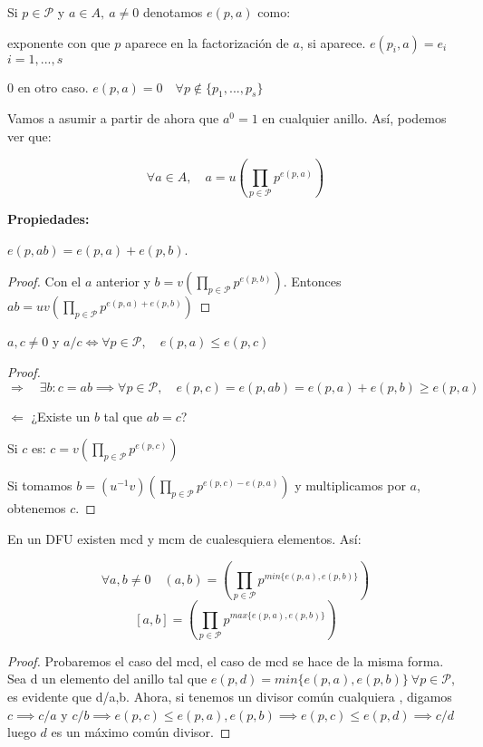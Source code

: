 \begin{ndef}[]
	Si $p\in \mathcal{P}$ y $a \in A,\ a \ne 0$ denotamos $e(p,a)$ como:
	\begin{nlist}
	\item exponente con que $p$ aparece en la factorización de $a$, si aparece. $e(p_i,a) = e_i$ \quad $i = 1,...,s$
	\item 0 en otro caso. $e(p,a) = 0 \quad \forall p \notin \{p_1,...,p_s\}$

\end{nlist}

	Vamos a asumir a partir de ahora que $a^0  = 1 $ en cualquier anillo. Así, podemos ver que:

	$$\forall a \in A, \quad a = u(\prod _{p \in \mathcal{P}}p^{e(p,a)})$$
\end{ndef}

\textbf{Propiedades:}
\begin{nlist}
	\item $e(p,ab) = e(p,a) + e(p,b)$.\\

	\begin{proof}

	Con el $a$ anterior y $b= v(\prod _{p \in \mathcal{P}}p^{e(p,b)})$. Entonces $ab = uv(\prod _{p \in \mathcal{P}}p^{e(p,a)+ e(p,b)})$
\end{proof}

\item $a,c \ne 0$ y $a/c \iff \forall p \in \mathcal{P}, \quad e(p,a) \leq e(p,c)$\\

\begin{proof}
	$\boxed{\Rightarrow} \quad \exists b: c =ab \implies \forall p \in \mathcal{P}, \quad e(p,c) = e(p,ab) = e(p,a)+e(p,b) \geq e(p,a) $

	$\boxed{\Leftarrow} $ ¿Existe un $b$ tal que $ab= c$?

	Si $c$ es: $c = v(\prod _{p \in \mathcal{P}}p^{e(p,c)})$

	Si tomamos $b = (u^{-1}v)(\prod _{p \in \mathcal{P}}p^{e(p,c) - e(p,a)}) $ y multiplicamos por $a$, obtenemos $c$.
\end{proof}
\end{nlist}

\begin{nprop}
En un DFU existen mcd y mcm de cualesquiera elementos. Así:

\[
\forall a,b \ne 0 \quad (a,b) = (\prod _{p \in \mathcal{P}}p^{min\{e(p,a),e(p,b)\}})
\]
\[
[a,b] = (\prod _{p \in \mathcal{P}}p^{max\{e(p,a),e(p,b)\}})
\]

\end{nprop}
\begin{proof}
	Probaremos el caso del mcd, el caso de mcd se hace de la misma forma.\\
	Sea d un elemento del anillo tal que $e(p,d) = min\{e(p,a), e(p,b)\}\ \forall p \in \mathcal{P}$, es evidente que d/a,b. Ahora, si tenemos un divisor común cualquiera , digamos $c \implies c/a$  y $c/b \implies e(p,c) \leq e(p,a),e(p,b) \implies e(p,c) \leq e(p,d) \implies c/d$ luego $d$ es un máximo común divisor.
\end{proof}

